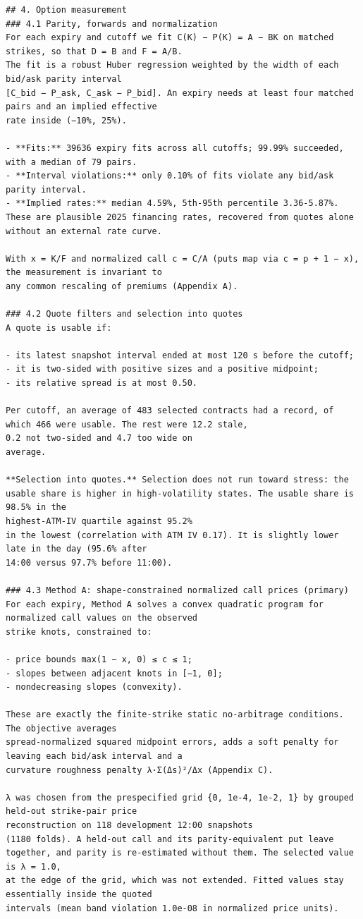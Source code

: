 \documentclass[11pt]{article}
\begin{document}
\begin{verbatim}
## 4. Option measurement
### 4.1 Parity, forwards and normalization
For each expiry and cutoff we fit C(K) − P(K) = A − BK on matched strikes, so that D = B and F = A/B.
The fit is a robust Huber regression weighted by the width of each bid/ask parity interval
[C_bid − P_ask, C_ask − P_bid]. An expiry needs at least four matched pairs and an implied effective
rate inside (−10%, 25%).

- **Fits:** 39636 expiry fits across all cutoffs; 99.99% succeeded, with a median of 79 pairs.
- **Interval violations:** only 0.10% of fits violate any bid/ask parity interval.
- **Implied rates:** median 4.59%, 5th-95th percentile 3.36-5.87%. These are plausible 2025 financing rates, recovered from quotes alone without an external rate curve.

With x = K/F and normalized call c = C/A (puts map via c = p + 1 − x), the measurement is invariant to
any common rescaling of premiums (Appendix A).

### 4.2 Quote filters and selection into quotes
A quote is usable if:

- its latest snapshot interval ended at most 120 s before the cutoff;
- it is two-sided with positive sizes and a positive midpoint;
- its relative spread is at most 0.50.

Per cutoff, an average of 483 selected contracts had a record, of
which 466 were usable. The rest were 12.2 stale,
0.2 not two-sided and 4.7 too wide on
average.

**Selection into quotes.** Selection does not run toward stress: the usable share is higher in high-volatility states. The usable share is
98.5% in the
highest-ATM-IV quartile against 95.2%
in the lowest (correlation with ATM IV 0.17). It is slightly lower
late in the day (95.6% after
14:00 versus 97.7% before 11:00).

### 4.3 Method A: shape-constrained normalized call prices (primary)
For each expiry, Method A solves a convex quadratic program for normalized call values on the observed
strike knots, constrained to:

- price bounds max(1 − x, 0) ≤ c ≤ 1;
- slopes between adjacent knots in [−1, 0];
- nondecreasing slopes (convexity).

These are exactly the finite-strike static no-arbitrage conditions. The objective averages
spread-normalized squared midpoint errors, adds a soft penalty for leaving each bid/ask interval and a
curvature roughness penalty λ·Σ(Δs)²/Δx (Appendix C).

λ was chosen from the prespecified grid {0, 1e-4, 1e-2, 1} by grouped held-out strike-pair price
reconstruction on 118 development 12:00 snapshots
(1180 folds). A held-out call and its parity-equivalent put leave
together, and parity is re-estimated without them. The selected value is λ = 1.0,
at the edge of the grid, which was not extended. Fitted values stay essentially inside the quoted
intervals (mean band violation 1.0e-08 in normalized price units).


\end{verbatim}
\end{document}
